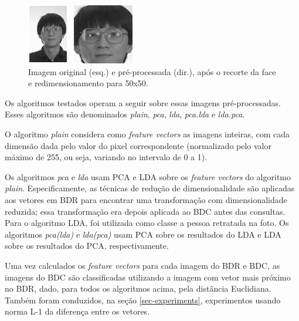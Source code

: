 \documentclass[10pt,twocolumn,letterpaper]{article}
\begin{document}
\begin{figure}
\begin{center}
	\includegraphics[width=0.99\columnwidth]{pics/cropping.png}
	\caption{Imagem original (esq.) e pré-processada (dir.), após o recorte da face e redimensionamento para 50x50.}
	\label{fig-cropping}   
\end{center} 
\end{figure}  

Os algoritmos testados operam a seguir sobre essas imagens pré-processadas. Esses algoritmos são denominados \emph{plain}, \emph{pca}, \emph{lda}, \emph{pca.lda} e \emph{lda.pca}.

O algoritmo \emph{plain} considera como \emph{feature vectors} as imagens inteiras, com cada dimensão dada pelo valor do pixel correspondente (normalizado pelo valor máximo de 255, ou seja, variando no intervalo de 0 a 1).

Os algoritmos \emph{pca} e \emph{lda} usam PCA e LDA sobre os \emph{feature vectors} do algoritmo \emph{plain}. Especificamente, as técnicas de redução de dimensionalidade são aplicadas aos vetores em BDR para encontrar uma transformação com dimensionalidade reduzida; essa transformação era depois aplicada ao BDC antes das consultas. Para o algoritmo LDA, foi utilizada como classe a pessoa retratada na foto. Os algoritmos \emph{pca(lda)} e \emph{lda(pca)} usam PCA sobre os resultados do LDA e LDA sobre os resultados do PCA, respectivamente.

Uma vez calculados os  \emph{feature vectors} para cada imagem do BDR e BDC, as imagens do BDC são classificadas utilizando a imagem com vetor mais próximo no BDR, dado, para todos os algoritmos acima, pela distância Euclidiana. Também foram conduzidos, na seção \ref{sec-experiments}, experimentos usando norma L-1 da diferença entre os vetores.
\end{document}
